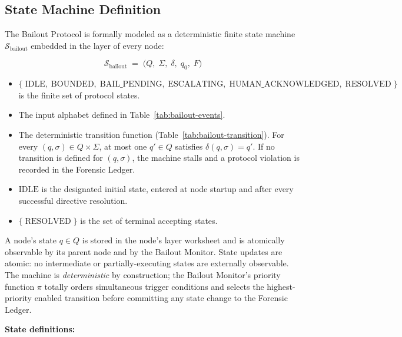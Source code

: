 \subsection{State Machine Definition}\label{sec:bailout-state-machine}

The Bailout Protocol is formally modeled as a deterministic finite state machine
$\mathcal{S}_{\text{bailout}}$ embedded in the \fact{} layer of every \bxthree{}
node:

\[
\mathcal{S}_{\text{bailout}} \;=\; \bigl( Q,\; \Sigma,\; \delta,\; q_0,\; F \bigr)
\]

\begin{itemize}\itemsep=0pt
\item[$Q$] $\{\;\text{IDLE},\; \text{BOUNDED},\; \text{BAIL\_PENDING},\;
  \text{ESCALATING},\; \text{HUMAN\_ACKNOWLEDGED},\; \text{RESOLVED}\; \}$ is the
  finite set of protocol states.
\item[$\Sigma$] The input alphabet defined in Table~\ref{tab:bailout-events}.
\item[$\delta : Q \times \Sigma \to Q$] The deterministic transition function
  (Table~\ref{tab:bailout-transition}). For every $(q, \sigma) \in Q \times
  \Sigma$, at most one $q' \in Q$ satisfies $\delta(q, \sigma) = q'$.
  If no transition is defined for $(q, \sigma)$, the machine stalls and a
  protocol violation is recorded in the Forensic Ledger.
\item[$q_0$] $\text{IDLE}$ is the designated initial state, entered at node
  startup and after every successful directive resolution.
\item[$F$] $\{\;\text{RESOLVED}\; \}$ is the set of terminal accepting states.
\end{itemize}

A node's state $q \in Q$ is stored in the node's \fact{} layer worksheet and is
atomically observable by its parent node and by the Bailout Monitor. State updates
are atomic: no intermediate or partially-executing states are externally
observable. The machine is \emph{deterministic} by construction; the Bailout
Monitor's priority function $\pi$ totally orders simultaneous trigger conditions
and selects the highest-priority enabled transition before committing any state
change to the Forensic Ledger.

\bigskip

\noindent\textbf{State definitions:}

